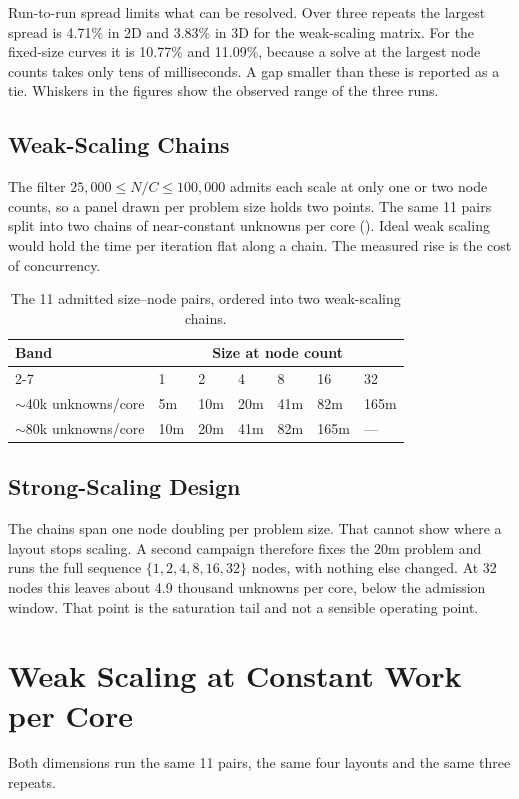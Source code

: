 \documentclass[12pt,a4paper,notitlepage]{report}
\let\OldSubsection\subsection
\renewcommand{\subsection}{\FloatBarrier\OldSubsection}
\begin{document}
Run-to-run spread limits what can be resolved. Over three repeats the largest spread is
4.71\% in 2D and 3.83\% in 3D for the weak-scaling matrix. For the fixed-size curves it is
10.77\% and 11.09\%, because a solve at the largest node counts takes only tens of
milliseconds. A gap smaller than these is reported as a tie. Whiskers in the figures show the
observed range of the three runs.

\subsection{Weak-Scaling Chains}
\label{sec:bands}
The filter $25{,}000 \leq N/C \leq 100{,}000$ admits each scale at only one or two node
counts, so a panel drawn per problem size holds two points. The same 11 pairs split into
two chains of near-constant unknowns per core (). Ideal weak scaling would
hold the time per iteration flat along a chain. The measured rise is the cost of
concurrency.

\begin{table}[htbp]
  \centering
  \caption{The 11 admitted size--node pairs, ordered into two weak-scaling chains.}
  \label{tab:bands}
  \begin{tabular}{lllllll}
    \toprule
    Band & \multicolumn{6}{c}{Size at node count} \\
    \cmidrule(lr){2-7}
         & 1 & 2 & 4 & 8 & 16 & 32 \\
    \midrule
    $\sim$40k unknowns/core & 5m & 10m & 20m & 41m & 82m & 165m \\
    $\sim$80k unknowns/core & 10m & 20m & 41m & 82m & 165m & --- \\
    \bottomrule
  \end{tabular}
\end{table}

\subsection{Strong-Scaling Design}
\label{sec:strong20m}
The chains span one node doubling per problem size. That cannot show where a layout stops
scaling. A second campaign therefore fixes the 20m problem and runs the full sequence
$\{1,2,4,8,16,32\}$ nodes, with nothing else changed. At 32 nodes this leaves about 4.9
thousand unknowns per core, below the admission window. That point is the saturation tail
and not a sensible operating point.

\section{Weak Scaling at Constant Work per Core}
\label{sec:weak}
Both dimensions run the same 11 pairs, the same four layouts and the same three repeats.
\end{document}
